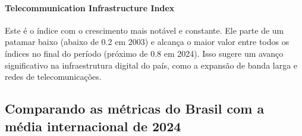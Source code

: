 \paragraph{Telecommunication Infrastructure Index} Este é o índice com o crescimento mais notável e constante. Ele parte de um patamar baixo (abaixo de 0.2 em 2003) e alcança o maior valor entre todos os índices no final do período (próximo de 0.8 em 2024). Isso sugere um avanço significativo na infraestrutura digital do país, como a expansão de banda larga e redes de telecomunicações.

\subsection{Comparando as métricas do Brasil com a média internacional de 2024}

